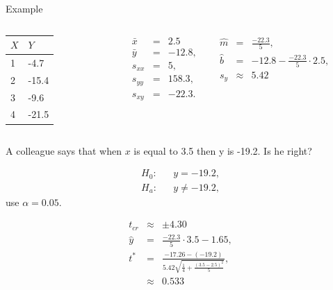 \begin{frame}{Example}

  \vspace*{-4em}

    \begin{columns}

      \begin{tabular}{l|l}
        $X$ & $Y$ \\ \hline
        1 &  -4.7 \\
        2 & -15.4  \\
        3 &  -9.6 \\
        4 & -21.5 
      \end{tabular}


      \begin{eqnarray*}
        \bar{x} & = & 2.5 \\
        \bar{y} & = & -12.8, \\
        s_{xx} & = & 5, \\
        s_{yy} & = & 158.3, \\
        s_{xy} & = & -22.3.
      \end{eqnarray*}


      \begin{eqnarray*}
        \hat{m} & = & \frac{-22.3}{5}, \\
        \hat{b} & = & -12.8 - \frac{-22.3}{5} \cdot 2.5, \\
        s_y & \approx & 5.42
      \end{eqnarray*}

      \begin{eqnarray*}
      \end{eqnarray*}

    \end{columns}


    \vfill 


    A colleague says that when $x$ is equal to 3.5 then y is -19.2. Is
    he right?

      {
        \begin{eqnarray*}
          H_0: & & y=-19.2, \\
          H_a: & & y\neq -19.2,
        \end{eqnarray*}
        use $\alpha=0.05$.
      }

      {
        \begin{eqnarray*}
          t_{cr} & \approx & \pm 4.30 \\
          \hat{y} & = & \frac{-22.3}{5} \cdot 3.5 - 1.65, \\
          t^* & = & \frac{-17.26-(-19.2)}{5.42\sqrt{\frac{1}{4} + \frac{(3.5-2.5)^2}{5}}}, \\
          & \approx &  0.533
        \end{eqnarray*}
      }



\end{frame}
